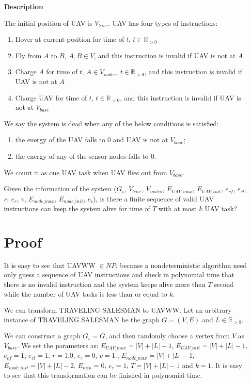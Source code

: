 \documentclass[11pt]{article}
\begin{document}
\noindent
\textbf{Description}

The initial position of UAV is $V_{base}$. UAV has four types of instructions:
\begin{enumerate}[noitemsep]
\item Hover at current position for time of $t$, $t \in \mathbb{R}_{>0}$
\item Fly from $A$ to $B$, $A,B \in V$, and this instruction is invalid if UAV is not at $A$
\item Charge $A$ for time of $t$, $A \in V_{nodes}$, $t \in \mathbb{R}_{>0}$, and this instruction is invalid if UAV is not at $A$
\item Charge UAV for time of $t$, $t \in \mathbb{R}_{>0}$, and this instruction is invalid if UAV is not at $V_{base}$
\end{enumerate}

We say the system is dead when any of the below conditions is satisfied:
\begin{enumerate}[noitemsep]
\item the energy of the UAV falls to 0 and UAV is not at $V_{base}$;
\item the energy of any of the sensor nodes falls to 0.
\end{enumerate}

We count it as one UAV task when UAV flies out from $V_{base}$.

Given the information of the system ($G_s$, $V_{base}$, $V_{nodes}$, $E_{UAV\_max} $, $E_{UAV\_init}$, $e_{cf}$, $e_{ct}$, $r$, $e_r$, $v$, $E_{node\_max}$, $E_{node\_init}$, $e_{c}$), is there a finite sequence of valid UAV instructions can keep the system alive for time of $T$ with at most $k$ UAV task?

\section{Proof}
It is easy to see that UAVWW $\in NP$, because a nondeterministic algorithm need only guess a sequence of UAV instructions and check in polynomial time that there is no invalid instruction and the system keeps alive more than $T$ second while the number of UAV tasks is less than or equal to $k$.

We can transform TRAVELING SALESMAN to UAVWW. Let an arbitrary instance of TRAVELING SALESMAN be the graph $G = (V, E)$ and $L \in \mathbb{R}_{>0}$.

We can construct a graph $G_s = G$, and then randomly choose a vertex from $V$ as $V_{base}$. We set the parameters as: $E_{UAV\_max} = |V| + |L| - 1$, $E_{UAV\_init} = |V| + |L| - 1$, $e_{cf} = 1$, $e_{ct} = 1$, $r = 1.0$, $e_r = 0$, $v = 1$., $E_{node\_max} = |V| + |L| - 1$, $E_{node\_init} = |V| + |L| - 2$, $E_{min} = 0$, $e_{c} = 1$, $T = |V| + |L| - 1$ and $k = 1$. It is easy to see that this transformation can be finished in polynomial time.
\end{document}
